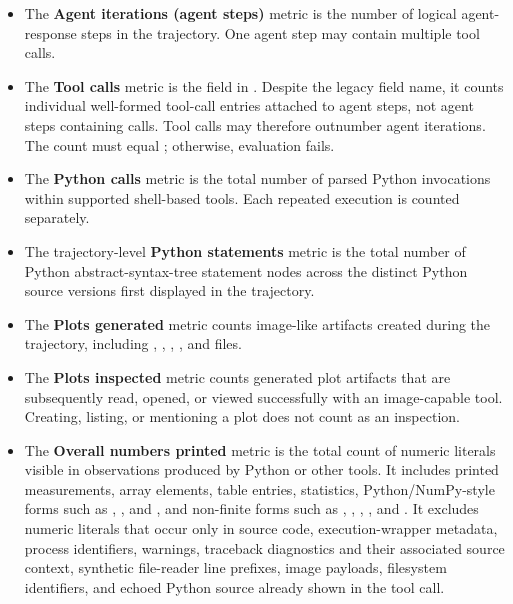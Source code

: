 \documentclass[11pt]{article}
\begin{document}
\begin{itemize}
  \item The \textbf{Agent iterations (agent steps)} metric is the number of logical agent-response steps in the trajectory.
  One agent step may contain multiple tool calls.

  \item The \textbf{Tool calls} metric is the  field in .
  Despite the legacy field name, it counts individual well-formed tool-call entries attached to agent steps, not agent steps containing calls.
  Tool calls may therefore outnumber agent iterations.
  The count must equal ; otherwise, evaluation fails.

  \item The \textbf{Python calls} metric is the total number of parsed Python invocations within supported shell-based tools.
  Each repeated execution is counted separately.

  \item The trajectory-level \textbf{Python statements} metric is the total number of Python abstract-syntax-tree statement nodes across the distinct Python source versions first displayed in the trajectory.

  \item The \textbf{Plots generated} metric counts image-like artifacts created during the trajectory, including , , , , and  files.

  \item The \textbf{Plots inspected} metric counts generated plot artifacts that are subsequently read, opened, or viewed successfully with an image-capable tool.
  Creating, listing, or mentioning a plot does not count as an inspection.

  \item {}\label{metric:overall-numbers-printed}%
  The \textbf{Overall numbers printed} metric is the total count of numeric literals visible in observations produced by Python or other tools.
  It includes printed measurements, array elements, table entries, statistics, Python/NumPy-style forms such as , , and , and non-finite forms such as , , , , and .
  It excludes numeric literals that occur only in source code, execution-wrapper metadata, process identifiers, warnings, traceback diagnostics and their associated source context, synthetic file-reader line prefixes, image payloads, filesystem identifiers, and echoed Python source already shown in the tool call.


\end{itemize}
\end{document}
